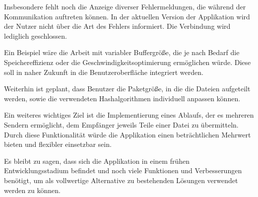 Insbesondere fehlt noch die Anzeige diverser Fehlermeldungen, die während der Kommunikation auftreten können. In der aktuellen Version der Applikation wird der Nutzer nicht über die Art des Fehlers informiert. Die Verbindung wird lediglich geschlossen.

Ein Beispiel wäre die Arbeit mit variabler Buffergröße, die je nach Bedarf die Speichereffizienz oder die Geschwindigkeitsoptimierung ermöglichen würde. Diese soll in naher Zukunft in die Benutzeroberfläche integriert werden.

Weiterhin ist geplant, dass Benutzer die Paketgröße, in die die Dateien aufgeteilt werden, sowie die verwendeten Hashalgorithmen individuell anpassen können.

Ein weiteres wichtiges Ziel ist die Implementierung eines Ablaufs, der es mehreren Sendern ermöglicht, dem Empfänger jeweils Teile einer Datei zu übermitteln. Durch diese Funktionalität würde die Applikation einen beträchtlichen Mehrwert bieten und flexibler einsetzbar sein.

Es bleibt zu sagen, dass sich die Applikation in einem frühen Entwicklungsstadium befindet und noch viele Funktionen und Verbesserungen benötigt, um als vollwertige Alternative zu bestehenden Lösungen verwendet werden zu können.